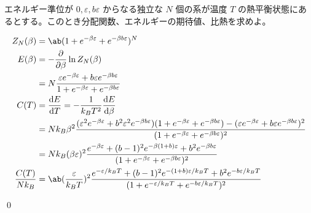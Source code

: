 \documentclass[uplatex,dvipdfmx,a4paper,11pt]{jlreq}
\makeatletter
\theoremstyle{definition}
\renewenvironment{proof}[1][\proofname]{\par
  \normalfont
  \topsep6\p@\@plus6\p@ \trivlist
  \item[\hskip\labelsep{\bfseries #1}\@addpunct{\bfseries}]\ignorespaces\quad\par
}{%
  \qed\endtrivlist\@endpefalse
}
\renewcommand\proofname{証明}
\makeatother
\begin{document}
\begin{problem}
エネルギー準位が $0, \varepsilon, b\varepsilon$ からなる独立な $N$ 個の系が温度 $T$ の熱平衡状態にあるとする。このとき分配関数、エネルギーの期待値、比熱を求めよ。
\end{problem}
\begin{proof}
  \begin{align}
    Z_N(\beta)        & = \ab(1 + e^{-\beta\varepsilon} + e^{-\beta b\varepsilon})^N                                                                                                                                                                                                                                      \\
    E(\beta)          & = -\diffp{}{\beta}\ln Z_N(\beta)                                                                                                                                                                                                                                                                  \\
                      & = N\frac{\varepsilon e^{-\beta\varepsilon} + b\varepsilon e^{-\beta b\varepsilon}}{1 + e^{-\beta\varepsilon} + e^{-\beta b\varepsilon}}                                                                                                                                                           \\
    C(T)              & = \diff{E}{T} = -\frac{1}{k_BT^2}\diff{E}{\beta}                                                                                                                                                                                                                                                  \\
                      & = Nk_B\beta^2\frac{(\varepsilon^2 e^{-\beta\varepsilon} + b^2\varepsilon^2 e^{-\beta b\varepsilon})(1 + e^{-\beta\varepsilon} + e^{-\beta b\varepsilon}) - (\varepsilon e^{-\beta\varepsilon} + b\varepsilon e^{-\beta b\varepsilon})^2}{(1 + e^{-\beta\varepsilon} + e^{-\beta b\varepsilon})^2} \\
                      & = Nk_B(\beta\varepsilon)^2\frac{e^{-\beta\varepsilon} + (b - 1)^2e^{-\beta(1 + b)\varepsilon} + b^2e^{-\beta b\varepsilon}}{(1 + e^{-\beta\varepsilon} + e^{-\beta b\varepsilon})^2}                                                                                                              \\
    \frac{C(T)}{Nk_B} & = \ab(\frac{\varepsilon}{k_BT})^2\frac{e^{-\varepsilon/k_BT} + (b - 1)^2e^{-(1 + b)\varepsilon/k_BT} + b^2e^{-b\varepsilon/k_BT}}{(1 + e^{-\varepsilon/k_BT} + e^{-b\varepsilon/k_BT})^2}
  \end{align}

\end{proof}
\end{document}
